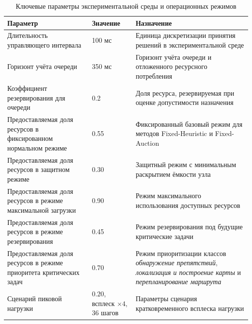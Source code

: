 \begin{table}[h]
	\centering
	\small
	\caption{Ключевые параметры экспериментальной среды и операционных режимов}
	\label{tab:appendix_env_params}
	\begin{tabular}{|p{}|p{}|p{}|}
		\hline
		\textbf{Параметр} &
		\textbf{Значение} &
		\textbf{Назначение} \\
		\hline
		Длительность управляющего интервала &
		100 мс &
		Единица дискретизации принятия решений в экспериментальной среде \\
		\hline
		Горизонт учёта очереди &
		350 мс &
		Горизонт учёта очереди и отложенного ресурсного потребления \\
		\hline
		Коэффициент резервирования для очереди &
		0.2 &
		Доля ресурса, резервируемая при оценке допустимости назначения \\
		\hline
		Предоставляемая доля ресурсов в фиксированном нормальном режиме &
		0.55 &
		Фиксированный базовый режим для методов Fixed-Heuristic и Fixed-Auction \\
		\hline
		Предоставляемая доля ресурсов в защитном режиме &
		0.30 &
		Защитный режим с минимальным раскрытием ёмкости узла \\
		\hline
		Предоставляемая доля ресурсов в режиме максимальной загрузки &
		0.90 &
		Режим максимального использования доступных ресурсов \\
		\hline
		Предоставляемая доля ресурсов в режиме резервирования &
		0.45 &
		Режим резервирования под будущие критические задачи \\
		\hline
		Предоставляемая доля ресурсов в режиме приоритета критических задач &
		0.70 &
		Режим приоритизации классов \textit{обнаружение препятствий}, \textit{локализация и построение карты} и \textit{перепланирование маршрута} \\
		\hline
		Сценарий пиковой нагрузки &
		$0.20$, всплеск $\times 4$, 36 шагов &
		Параметры сценария кратковременного всплеска нагрузки \\
		\hline
	\end{tabular}
\end{table}
